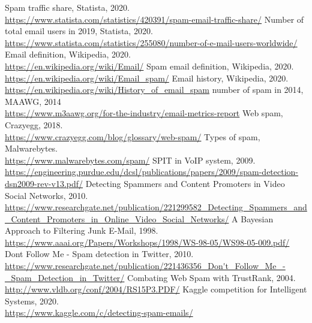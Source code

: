 \documentclass[runningheads]{llncs}
\begin{document}
\begin{thebibliography}{8}
%
%
Spam traffic share, Statista, 2020. \\ \url{https://www.statista.com/statistics/420391/spam-email-traffic-share/}
%
Number of total email users in 2019, Statista, 2020. \\ \url{https://www.statista.com/statistics/255080/number-of-e-mail-users-worldwide/}
%
Email definition, Wikipedia, 2020. \\ 
\url{https://en.wikipedia.org/wiki/Email/}
%
Spam email definition, Wikipedia, 2020. \\ 
\url{https://en.wikipedia.org/wiki/Email_spam/}
%
Email history, Wikipedia, 2020. \\ 
\url{https://en.wikipedia.org/wiki/History_of_email_spam}
%
number of spam in 2014, MAAWG, 2014 \\
\url{https://www.m3aawg.org/for-the-industry/email-metrics-report}
%
Web spam, Crazyegg, 2018. \\ 
\url{https://www.crazyegg.com/blog/glossary/web-spam/}
%
Types of spam, Malwarebytes. \\ 
\url{https://www.malwarebytes.com/spam/}
%
SPIT in VoIP system, 2009. \\ 
\url{https://engineering.purdue.edu/dcsl/publications/papers/2009/spam-detection-dsn2009-rev-v13.pdf/}
%
Detecting Spammers and Content Promoters in Video Social Networks, 2010. \\ 
\url{https://www.researchgate.net/publication/221299582_Detecting_Spammers_and_Content_Promoters_in_Online_Video_Social_Networks/}
%
A Bayesian Approach to Filtering Junk E-Mail, 1998. \\ 
\url{https://www.aaai.org/Papers/Workshops/1998/WS-98-05/WS98-05-009.pdf/}
%
Dont Follow Me - Spam detection in Twitter, 2010. \\ 
\url{https://www.researchgate.net/publication/221436356_Don't_Follow_Me_-_Spam_Detection_in_Twitter/}
%
Combating Web Spam with TrustRank, 2004. \\
\url{http://www.vldb.org/conf/2004/RS15P3.PDF/}
%
Kaggle competition for Intelligent Systems, 2020. \\
\url{https://www.kaggle.com/c/detecting-spam-emails/}
%
%
%
\end{thebibliography}
%
%
%
\end{document}
